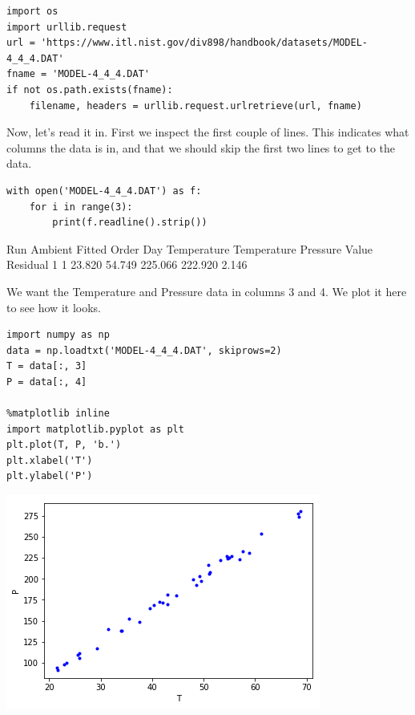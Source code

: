 \documentclass[11pt]{article}
\begin{document}
\begin{verbatim}
import os
import urllib.request
url = 'https://www.itl.nist.gov/div898/handbook/datasets/MODEL-4_4_4.DAT'
fname = 'MODEL-4_4_4.DAT'
if not os.path.exists(fname):
    filename, headers = urllib.request.urlretrieve(url, fname)
\end{verbatim}

Now, let's read it in. First we inspect the first couple of lines. This indicates what columns the data is in, and that we should skip the first two lines to get to the data.

\begin{verbatim}
with open('MODEL-4_4_4.DAT') as f:
    for i in range(3):
        print(f.readline().strip())
\end{verbatim}

Run          Ambient                            Fitted
Order  Day  Temperature  Temperature  Pressure    Value    Residual
1      1      23.820      54.749      225.066   222.920     2.146

We want the Temperature and Pressure data in columns 3 and 4. We plot it here to see how it looks.

\begin{verbatim}
import numpy as np
data = np.loadtxt('MODEL-4_4_4.DAT', skiprows=2)
T = data[:, 3]
P = data[:, 4]

%matplotlib inline
import matplotlib.pyplot as plt
plt.plot(T, P, 'b.')
plt.xlabel('T')
plt.ylabel('P')
\end{verbatim}

\begin{center}
\includegraphics[width=.9\linewidth]{obipy-resources/a10feaf5270288b4c795ebce6b64fde6-70304TaV.png}
\end{center}
\end{document}
